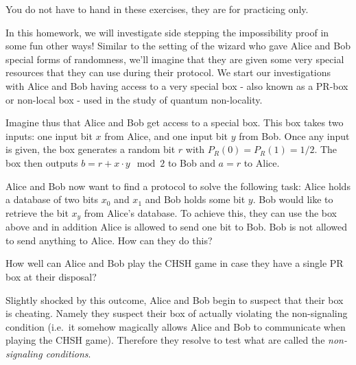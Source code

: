 \documentclass[a4paper,10pt,landscape,twocolumn]{scrartcl}
\begin{document}
\newcommand{\Hi}{\mathcal{H}}

\practiceproblems

{\sffamily\noindent
You do not have to hand in these exercises, they are for practicing only. %
}

\begin{exercise}
In this homework, we will investigate side stepping the impossibility proof in some fun other ways! Similar to the setting of the wizard who gave Alice and Bob special forms of randomness, we'll imagine that they are given some very special resources that they can use during their protocol. We start our investigations with Alice and Bob having access to a very special box - also known as a PR-box or non-local box - used in the study of quantum non-locality. 

Imagine thus that Alice and Bob get access to a special box. This box takes two inputs: one input bit $x$ from Alice, and one input bit $y$ from Bob. Once any input is given, the box generates a random bit $r$ with $P_R(0)=P_R(1)=1/2$. The box then outputs $b=r+ x \cdot y \mod 2$ to Bob and $a=r$ to Alice.

\begin{subex}
Alice and Bob now want to find a protocol to solve the following task: Alice holds a database of two bits $x_0$ and $x_1$ and Bob holds some bit $y$. Bob would like to retrieve the bit $x_y$ from Alice's database. To achieve this, they can use the box above and in addition Alice is allowed to send one bit to Bob. Bob is not allowed to send anything to Alice. How can they do this?
\end{subex}

\begin{subex}
How well can Alice and Bob play the CHSH game in case they have a single PR box at their disposal?
\end{subex}

\begin{subex}
Slightly shocked by this outcome, Alice and Bob begin to suspect that their box is cheating. Namely they suspect their box of actually violating the non-signaling condition (i.e.\ it somehow magically allows Alice and Bob to communicate when playing the CHSH game). Therefore they resolve to test what are called the \emph{non-signaling conditions}. 


\end{subex}
\end{exercise}
\end{document}
